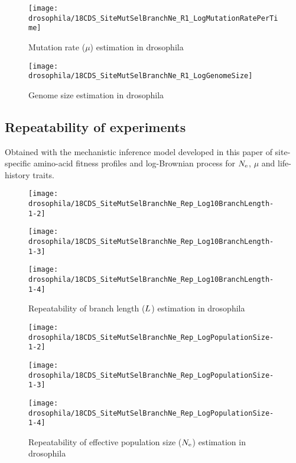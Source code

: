 \begin{figure}[H]
    \centering
    \texttt{[image: drosophila/18CDS\_SiteMutSelBranchNe\_R1\_LogMutationRatePerTime]}
    \caption[Mutation rate estimation in drosophila]{Mutation rate ($\mu$) estimation in drosophila}
\end{figure}

\begin{figure}[H]
    \centering
    \texttt{[image: drosophila/18CDS\_SiteMutSelBranchNe\_R1\_LogGenomeSize]}
    \caption[Genome size estimation in drosophila]{Genome size estimation in drosophila}
\end{figure}

\subsection{Repeatability of experiments}
Obtained with the mechanistic inference model developed in this paper of site-specific amino-acid fitness profiles and log-Brownian process for $N_{\text{e}}$, $\mu$ and life-history traits.

\begin{figure}[H]
    \centering
    \begin{minipage}{0.32\linewidth}
        \texttt{[image: drosophila/18CDS\_SiteMutSelBranchNe\_Rep\_Log10BranchLength-1-2]}
    \end{minipage} \hfill
    \begin{minipage}{0.32\linewidth}
        \texttt{[image: drosophila/18CDS\_SiteMutSelBranchNe\_Rep\_Log10BranchLength-1-3]}
    \end{minipage} \hfill
    \begin{minipage}{0.32\linewidth}
        \texttt{[image: drosophila/18CDS\_SiteMutSelBranchNe\_Rep\_Log10BranchLength-1-4]}
    \end{minipage}
    \caption[Repeatability of branch length estimation in drosophila]{Repeatability of branch length ($L$) estimation in drosophila}
\end{figure}

\begin{figure}[H]
    \centering
    \begin{minipage}{0.32\linewidth}
        \texttt{[image: drosophila/18CDS\_SiteMutSelBranchNe\_Rep\_LogPopulationSize-1-2]}
    \end{minipage} \hfill
    \begin{minipage}{0.32\linewidth}
        \texttt{[image: drosophila/18CDS\_SiteMutSelBranchNe\_Rep\_LogPopulationSize-1-3]}
    \end{minipage} \hfill
    \begin{minipage}{0.32\linewidth}
        \texttt{[image: drosophila/18CDS\_SiteMutSelBranchNe\_Rep\_LogPopulationSize-1-4]}
    \end{minipage}
    \caption[Repeatability of {effective population size} estimation in drosophila]{Repeatability of {effective population size} ($N_{\text{e}}$) estimation in drosophila}
\end{figure}

